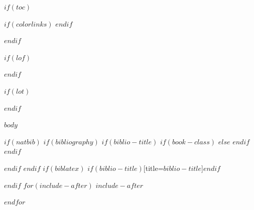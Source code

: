 \documentclass[$if(fontsize)$$fontsize$,$endif$$if(lang)$$babel-lang$,$endif$$if(papersize)$$papersize$paper,$endif$$for(classoption)$$classoption$$sep$,$endfor$]{$documentclass$}
\begin{document}
$if(toc)$
{
$if(colorlinks)$
\hypersetup{linkcolor=$if(toccolor)$$toccolor$$else$black$endif$}
$endif$
\setcounter{tocdepth}{$toc-depth$}
{}
\renewcommand\contentsname{$ind$}
\tableofcontents
}
$endif$

$if(lof)$
\renewcommand\listfigurename{$ind_fig$}
\listoffigures
\cleardoublepage
$endif$

$if(lot)$
\renewcommand\listtablename{$ind_tab$}
\listoftables
\cleardoublepage
$endif$

\pagestyle{fancy}

$body$

$if(natbib)$
$if(bibliography)$
$if(biblio-title)$
$if(book-class)$
\renewcommand\bibname{$biblio-title$}
$else$
\renewcommand\refname{$biblio-title$}
$endif$
$endif$


$endif$
$endif$
$if(biblatex)$
\printbibliography$if(biblio-title)$[title=$biblio-title$]$endif$

$endif$
$for(include-after)$
$include-after$

$endfor$
\end{document}
